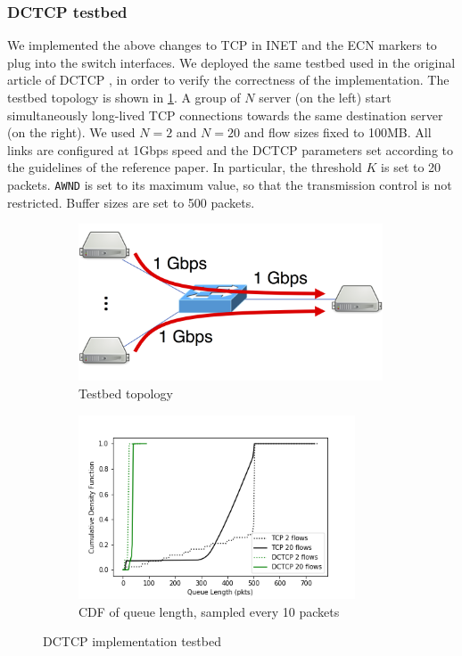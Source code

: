 \subsubsection{DCTCP testbed}
We implemented the above changes to TCP in INET and the ECN markers to plug into the switch interfaces. We deployed the same testbed used in the original article of DCTCP \cite{dctcp}, in order to verify the correctness of the implementation. The testbed topology is shown in \ref{fig:dctcp-testbed-topology}. A group of $N$ server (on the left) start simultaneously long-lived TCP connections towards the same destination server (on the right). We used $N=2$ and $N=20$ and flow sizes fixed to 100MB. All links are configured at 1Gbps speed and the DCTCP parameters set according to the guidelines of the reference paper. In particular, the threshold $K$ is set to 20 packets. \texttt{AWND} is set to its maximum value, so that the transmission control is not restricted. Buffer sizes are set to 500 packets.\\ 
\begin{figure}
	\centering
	\begin{subfigure}{.35\textwidth}
		\centering
		\includegraphics[width=0.99\textwidth]{Chapter4/Figures/dctcp-testbed}
		\caption{Testbed topology}
		\label{fig:dctcp-testbed-topology}		
	\end{subfigure}%
	\hfill
	\begin{subfigure}{.65\textwidth}
		\centering
		\includegraphics[width=0.9\textwidth]{Chapter4/Figures/dctcp-qlen}
		\caption{CDF of queue length, sampled every 10 packets}
		\label{fig:dctcp-testbed-res}		
	\end{subfigure}%
	\caption{DCTCP implementation testbed}
	\label{fig:dctcp-testbed}
\end{figure}%
